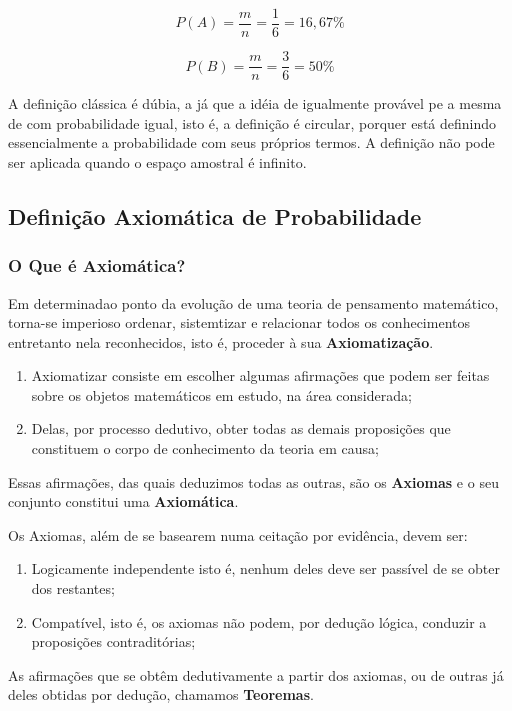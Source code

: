 $$
P(A)= \frac{m}{n}=\frac{1}{6}=16,67\%
$$

$$
P(B)= \frac{m}{n}=\frac{3}{6}=50\%
$$





\inic A definição clássica é dúbia, a já que a idéia de igualmente provável pe a mesma de com probabilidade igual, isto é, a definição é circular, porquer está definindo essencialmente a probabilidade com seus próprios termos. A definição não pode ser aplicada quando o espaço amostral é infinito.


 \newpage
\subsection{Definição Axiomática de Probabilidade}
\subsubsection{O Que é Axiomática?}

\inic Em determinadao ponto da evolução de uma teoria de pensamento matemático, torna-se imperioso ordenar, sistemtizar e relacionar todos os conhecimentos entretanto nela reconhecidos, isto é, proceder à sua \textbf{Axiomatização}. 
 
\begin{enumerate}
\item Axiomatizar consiste em escolher algumas afirmações que podem ser feitas sobre os objetos matemáticos em estudo, na área considerada;
\item Delas, por processo dedutivo, obter todas as demais proposições que constituem o corpo de conhecimento da teoria em causa;
\end{enumerate} 

\inic Essas afirmações, das quais deduzimos todas as outras, são os \textbf{Axiomas} e o seu conjunto constitui uma \textbf{Axiomática}.\vskip0.3cm
 

\inic Os Axiomas, além de se basearem numa ceitação por evidência, devem ser:

\begin{enumerate}
    \item Logicamente independente isto é, nenhum deles deve ser passível de se obter dos restantes;
    \item Compatível, isto é, os axiomas não podem, por dedução lógica, conduzir a proposições contraditórias; 
\end{enumerate}
 
 \inic As afirmações que se obtêm dedutivamente a partir dos axiomas, ou de outras já deles obtidas por dedução, chamamos \textbf{Teoremas}.\vskip0.3cm


